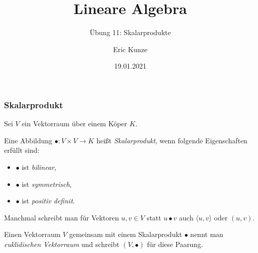 \documentclass{beamer}
\begin{document}
	\title{Lineare Algebra}
	\subtitle{Übung 11: Skalarprodukte}
	\author{Eric Kunze}
	\date{19.01.2021}

	\maketitle


\begin{frame} \frametitle{Skalarprodukt}
    Sei $V$ ein Vektorraum über einem Köper $K$.

    Eine Abbildung $\bullet : V \times V \to K$ heißt \emph{Skalarprodukt}, wenn folgende Eigenschaften erfüllt sind:
    \begin{itemize}
        \item $\bullet$ ist \emph{bilinear},
        \item $\bullet$ ist \emph{symmetrisch},
        \item $\bullet$ ist \emph{positiv definit}.
    \end{itemize}

    Manchmal schreibt man für Vektoren $u,v \in V$ statt $u \bullet v$ auch $\langle u , v \rangle$ oder $(u,v)$.
    
    Einen Vektorraum $V$ gemeinsam mit einem Skalarprodukt $\bullet$ nennt man \emph{euklidischen Vektorraum} und schreibt $(V, \bullet)$ für diese Paarung.
\end{frame}
\end{document}
